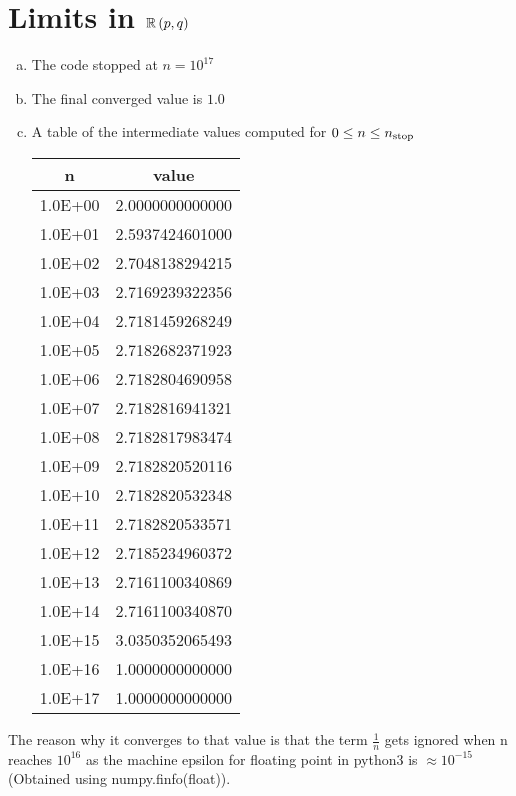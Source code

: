 \section{Limits in $\mathbb{R}\left(p,q\right)$}

\begin{enumerate}[(a)]
	\item The code stopped at $n = 10^{17}$
	\item The final converged value is $1.0$
	\item A table of the intermediate values computed for $0 \leq n \leq n_{\mathrm{stop}}$
	\begin{table}[H]
		\centering
		\begin{tabular}{c|c}
		n 	& value \\
		\hline
		1.0E+00 & 2.0000000000000 \\
		1.0E+01 & 2.5937424601000 \\
		1.0E+02 & 2.7048138294215 \\
		1.0E+03 & 2.7169239322356 \\
		1.0E+04 & 2.7181459268249 \\
		1.0E+05 & 2.7182682371923 \\
		1.0E+06 & 2.7182804690958 \\
		1.0E+07 & 2.7182816941321 \\
		1.0E+08 & 2.7182817983474 \\
		1.0E+09 & 2.7182820520116 \\
		1.0E+10 & 2.7182820532348 \\
		1.0E+11 & 2.7182820533571 \\
		1.0E+12 & 2.7185234960372 \\
		1.0E+13 & 2.7161100340869 \\
		1.0E+14 & 2.7161100340870 \\
		1.0E+15 & 3.0350352065493 \\
		1.0E+16 & 1.0000000000000 \\
		1.0E+17 & 1.0000000000000 		
		\end{tabular}
	\end{table}
\end{enumerate}
The reason why it converges to that value is that the term $\frac{1}{n}$ gets ignored when n reaches $10^{16}$ as the machine epsilon for floating point in python3 is $\approx 10^{-15}$ (Obtained using numpy.finfo(float)).